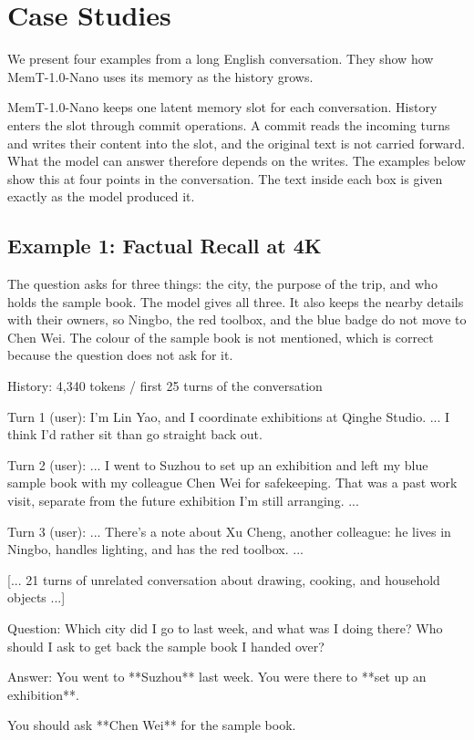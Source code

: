 \section{Case Studies}
\label{appendix:case_studies}

We present four examples from a long English conversation. They show how MemT-1.0-Nano uses its memory as the history grows.

MemT-1.0-Nano keeps one latent memory slot for each conversation. History enters the slot through commit operations. A commit reads the incoming turns and writes their content into the slot, and the original text is not carried forward.
What the model can answer therefore depends on the writes. The examples below show this at four points in the conversation.
The text inside each box is given exactly as the model produced it. 


\subsection{Example 1: Factual Recall at 4K}
\label{appendix:case_4k}

The question asks for three things: the city, the purpose of the trip, and who holds the sample book. The model gives all three. It also keeps the nearby details with their owners, so Ningbo, the red toolbox, and the blue badge do not move to Chen Wei. The colour of the sample book is not mentioned, which is correct because the question does not ask for it.

\begin{promptbox}
History: 4,340 tokens / first 25 turns of the conversation

Turn 1 (user): I'm Lin Yao, and I coordinate exhibitions at
  Qinghe Studio. ... I think I'd rather sit than go straight
  back out.

Turn 2 (user): ... I went to Suzhou to set up an exhibition and
  left my blue sample book with my colleague Chen Wei for
  safekeeping. That was a past work visit, separate from the
  future exhibition I'm still arranging. ...

Turn 3 (user): ... There's a note about Xu Cheng, another
  colleague: he lives in Ningbo, handles lighting, and has the
  red toolbox. ...

[... 21 turns of unrelated conversation about drawing,
cooking, and household objects ...]

Question: Which city did I go to last week, and what was I
  doing there? Who should I ask to get back the sample book I
  handed over?

Answer: You went to **Suzhou** last week. You were there to
  **set up an exhibition**.

  You should ask **Chen Wei** for the sample book.
\end{promptbox}


